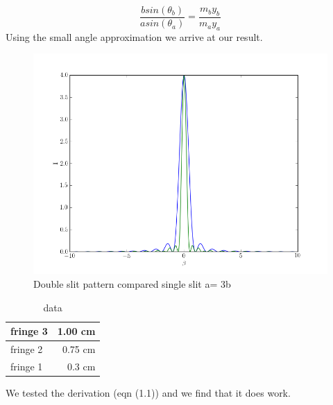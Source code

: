 \documentclass[paper=a4, fontsize=11pt]{scrartcl} %
\numberwithin{equation}{section} %
\numberwithin{figure}{section} %
\numberwithin{table}{section} %
\begin{document}
\begin{equation}
\frac{bsin(\theta_b)}{asin(\theta_a)} =  \frac{m_by_b}{m_ay_a}
\end{equation}
Using the small angle approximation we arrive at our result.
\begin{figure}[H]
\centering
\includegraphics[scale =0.4]{pattern}
\caption{Double slit pattern compared single slit a= 3b}
\end{figure}
\begin{table}
  \centering 
   \caption{data}
  \begin{tabular}{|l |r| }
    \hline
     fringe 3 & 1.00 cm \\ \hline
     fringe 2 & 0.75 cm \\ \hline
     fringe 1 & 0.3  cm \\  \hline
  \end{tabular}
\end{table}
We tested the derivation (eqn (1.1)) and we find that it does work.
\end{document}
